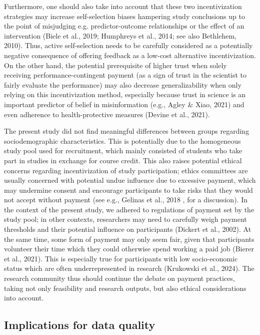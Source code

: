 \documentclass[authordate, empirical,issue]{jote-new-article}
\begin{document}
	Furthermore, one should also take into account that these two incentivization strategies may increase self-selection biases hampering study conclusions up to the point of misjudging e.g. predictor-outcome relationships or the effect of an intervention (Biele et al., 2019; Humphreys et al., 2014; see also Bethlehem, 2010). Thus, active self-selection needs to be carefully considered as a potentially negative consequence of offering feedback as a low-cost alternative incentivization. On the other hand, the potential prerequisite of higher trust when solely receiving performance-contingent payment (as a sign of trust in the scientist to fairly evaluate the performance) may also decrease generalizability when only relying on this incentivization method, especially because trust in science is an important predictor of belief in misinformation (e.g., Agley \& Xiao, 2021) and even adherence to health-protective measures (Devine et al., 2021).



	The present study did not find meaningful differences between groups regarding sociodemographic characteristics. This is potentially due to the homogeneous study pool used for recruitment, which mainly consisted of students who take part in studies in exchange for course credit. This also raises potential ethical concerns regarding incentivization of study participation; ethics committees are usually concerned with potential undue influence due to excessive payment, which may undermine consent and encourage participants to take risks that they would not accept without payment (see e.g., Gelinas et al., 2018 , for a discussion). In the context of the present study, we adhered to regulations of payment set by the study pool; in other contexts, researchers may need to carefully weigh payment thresholds and their potential influence on participants (Dickert et al., 2002). At the same time, some form of payment may only seem fair, given that participants volunteer their time which they could otherwise spend working a paid job (Bierer et al., 2021). This is especially true for participants with low socio-economic status which are often underrepresented in research (Krukowski et al., 2024). The research community thus should continue the debate on payment practices, taking not only feasibility and research outputs, but also ethical considerations into account.



	\subsection{Implications for data quality}
\end{document}
